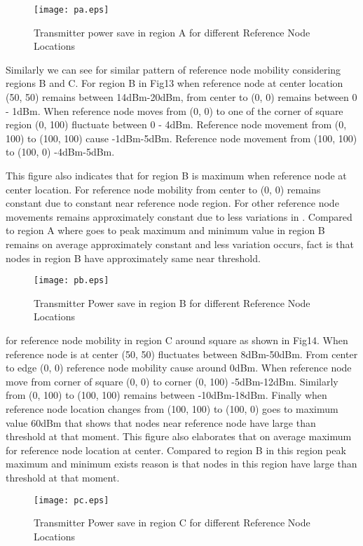 \documentclass[12pt, conference, compsocconf, onecolumn, draftcls]{IEEEtran}
\begin{document}
\begin{figure}[h]
\begin{center}
\texttt{[image: pa.eps]}
\caption{ Transmitter power save in region A for different Reference Node Locations}
\end{center}
\end{figure}

Similarly we can see  for similar pattern of reference node mobility considering regions B and C. For region B in Fig13 when reference node at center location (50, 50)   remains between 14dBm-20dBm, from center to (0, 0)  remains between 0 - 1dBm. When reference node moves from (0, 0) to one of the corner of square region (0, 100)   fluctuate between 0 - 4dBm. Reference node movement from (0, 100) to (100, 100)  cause  -1dBm-5dBm. Reference node movement from (100, 100) to (100, 0)  -4dBm-5dBm.

This figure also indicates  that  for region B is maximum when reference node at center location. For reference node mobility from center to (0, 0)  remains constant due to constant  near reference node region. For other reference node movements  remains approximately constant due to less variations in . Compared to region A where  goes to peak maximum and minimum value in region B  remains on average approximately constant and less variation occurs,  fact is that nodes in region B have approximately same  near threshold.

\begin{figure}[h]
\begin{center}
\texttt{[image: pb.eps]}
\caption{ Transmitter Power save in region B for different Reference Node Locations}
\end{center}
\end{figure}

 for reference node mobility in region C around square as shown in Fig14. When reference node is at center (50, 50)   fluctuates between 8dBm-50dBm. From center to edge (0, 0) reference node mobility cause  around 0dBm. When reference node move from corner of square (0, 0) to corner (0, 100)  -5dBm-12dBm. Similarly from (0, 100) to (100, 100)  remains between -10dBm-18dBm.  Finally when reference node location changes from (100, 100) to (100, 0)  goes to maximum value 60dBm that shows that nodes near reference node have large  than threshold  at that moment. This figure also elaborates that on average  maximum for reference node location at center. Compared to region B in this region peak maximum and minimum  exists reason is that nodes in this region have large  than threshold at that moment.
\begin{figure}[h]
\begin{center}
\texttt{[image: pc.eps]}
\caption{ Transmitter Power save in region C for different Reference Node Locations}
\end{center}
\end{figure}
\end{document}
